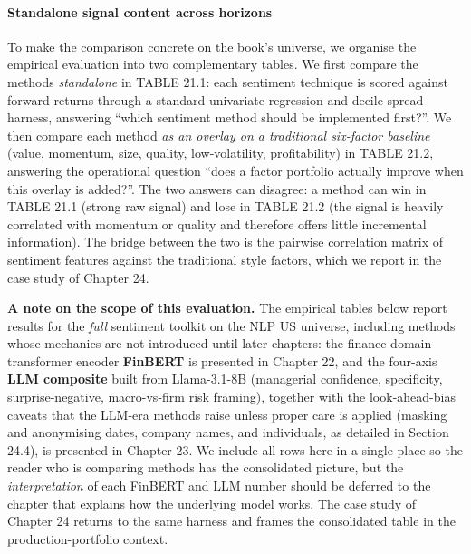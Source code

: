 \paragraph{Standalone signal content across horizons}

To make the comparison concrete on the book's universe, we organise the empirical evaluation into two complementary tables. We first compare the methods \textit{standalone} in TABLE 21.1: each sentiment technique is scored against forward returns through a standard univariate-regression and decile-spread harness, answering ``which sentiment method should be implemented first?''. We then compare each method \textit{as an overlay on a traditional six-factor baseline} (value, momentum, size, quality, low-volatility, profitability) in TABLE 21.2, answering the operational question ``does a factor portfolio actually improve when this overlay is added?''. The two answers can disagree: a method can win in TABLE 21.1 (strong raw signal) and lose in TABLE 21.2 (the signal is heavily correlated with momentum or quality and therefore offers little incremental information). The bridge between the two is the pairwise correlation matrix of sentiment features against the traditional style factors, which we report in the case study of Chapter 24.

\textbf{A note on the scope of this evaluation.} The empirical tables below report results for the \textit{full} sentiment toolkit on the NLP US universe, including methods whose mechanics are not introduced until later chapters: the finance-domain transformer encoder \textbf{FinBERT} is presented in Chapter 22, and the four-axis \textbf{LLM composite} built from Llama-3.1-8B (managerial confidence, specificity, surprise-negative, macro-vs-firm risk framing), together with the look-ahead-bias caveats that the LLM-era methods raise unless proper care is applied (masking and anonymising dates, company names, and individuals, as detailed in Section 24.4), is presented in Chapter 23. We include all rows here in a single place so the reader who is comparing methods has the consolidated picture, but the \textit{interpretation} of each FinBERT and LLM number should be deferred to the chapter that explains how the underlying model works. The case study of Chapter 24 returns to the same harness and frames the consolidated table in the production-portfolio context.

